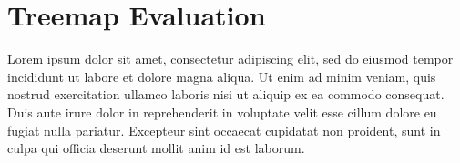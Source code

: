 \begingroup
\let\clearpage\relax
\let\cleardoublepage\relax
\let\cleardoublepage\relax

\manualmark
{} 

\chapter*{Treemap Evaluation}

Lorem ipsum dolor sit amet, consectetur adipiscing elit, sed do eiusmod tempor incididunt ut labore et dolore magna aliqua. Ut enim ad minim veniam, quis nostrud exercitation ullamco laboris nisi ut aliquip ex ea commodo consequat. Duis aute irure dolor in reprehenderit in voluptate velit esse cillum dolore eu fugiat nulla pariatur. Excepteur sint occaecat cupidatat non proident, sunt in culpa qui officia deserunt mollit anim id est laborum.

\newpage

\endgroup